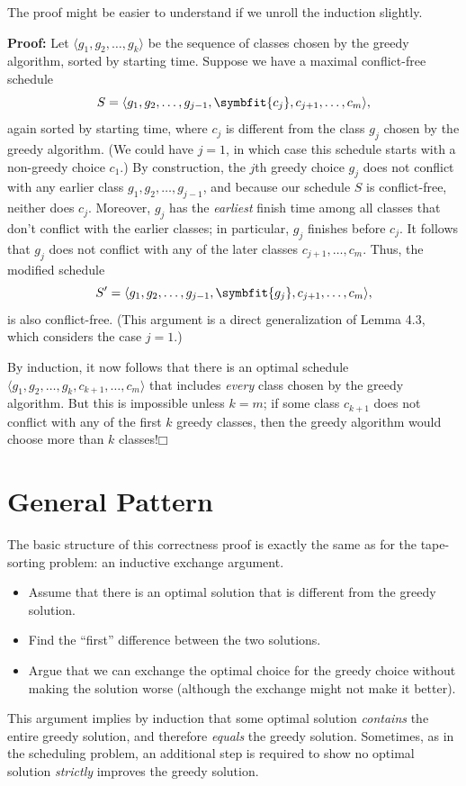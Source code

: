 The proof might be easier to understand if we unroll the induction slightly.

\noindent\textbf{Proof:} Let $\langle g_1, g_2, \dots, g_k \rangle$ be the sequence of classes chosen by the greedy algorithm, sorted by starting time.
Suppose we have a maximal conflict-free schedule
\[
S = \langle g_1, g_2, \dots, g_{j-1}, \symbfit{c_j}, c_{j+1}, \dots, c_m \rangle,
\]
again sorted by starting time, where $c_j$ is different from the class $g_j$ chosen by the greedy algorithm.
(We could have $j = 1$, in which case this schedule starts with a non-greedy choice $c_1$.)
By construction, the $j$th greedy choice $g_j$ does not conflict with any earlier class $g_1, g_2, \dots, g_{j-1}$, and because our schedule $S$ is conflict-free, neither does $c_j$.
Moreover, $g_j$ has the \textit{earliest} finish time among all classes that don’t conflict with the earlier classes; in particular, $g_j$ finishes before $c_j$.
It follows that $g_j$ does not conflict with any of the later classes $c_{j+1}, \dots, c_m$.
Thus, the modified schedule
\[
S' = \langle g_1, g_2, \dots, g_{j-1}, \symbfit{g_j}, c_{j+1}, \dots, c_m \rangle,
\]
is also conflict-free.
(This argument is a direct generalization of Lemma 4.3, which considers the case $j = 1$.)

By induction, it now follows that there is an optimal schedule $\langle g_1, g_2, \dots, g_k, c_{k+1}, \dots, c_m \rangle$ that includes \textit{every} class chosen by the greedy algorithm.
But this is impossible unless $k = m$; if some class $c_{k+1}$ does not conflict with any of the first $k$ greedy classes, then the greedy algorithm would choose more than $k$ classes!\hfill$\mdlgwhtsquare$

\section{General Pattern}
\label{sec:4.3}

The basic structure of this correctness proof is exactly the same as for the tape-sorting problem: an inductive exchange argument.
\begin{itemize}
\item Assume that there is an optimal solution that is different from the greedy solution.
\item Find the “first” difference between the two solutions.
\item Argue that we can exchange the optimal choice for the greedy choice without making the solution worse (although the exchange might not make it better).
\end{itemize}
This argument implies by induction that some optimal solution \textit{contains} the entire greedy solution, and therefore \textit{equals} the greedy solution.
Sometimes, as in the scheduling problem, an additional step is required to show no optimal solution \textit{strictly} improves the greedy solution.

